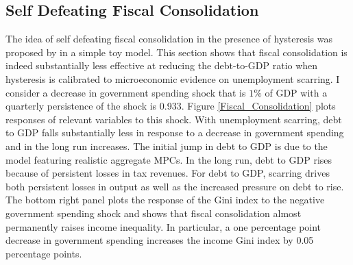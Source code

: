 \subsection{Self Defeating Fiscal Consolidation}

The idea of self defeating fiscal consolidation in the presence of hysteresis was proposed by \cite{FATAS2018} in a simple toy model. This section shows that fiscal consolidation is indeed substantially less effective at reducing the debt-to-GDP ratio when hysteresis is calibrated to microeconomic evidence on unemployment scarring. I consider a decrease in government spending shock that is $1\%$ of GDP with a quarterly persistence of the shock is 0.933. Figure \ref{Fiscal_Consolidation} plots responses of relevant variables to this shock. With unemployment scarring, debt to GDP falls substantially less in response to a decrease in government spending and in the long run increases. The initial jump in debt to GDP is due to the model featuring realistic aggregate MPCs. In the long run, debt to GDP rises because of persistent losses in tax revenues. For debt to GDP, scarring drives both persistent losses in output as well as the increased pressure on debt to rise. The bottom right panel plots the response of the Gini index to the negative government spending shock and shows that fiscal consolidation almost permanently raises income inequality. In particular, a one percentage point decrease in government spending increases the income Gini index by 0.05 percentage points.



